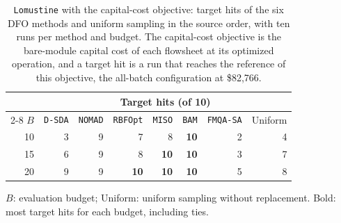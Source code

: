 \begin{table}[htbp]
\centering
\caption{\texttt{Lomustine} with the capital-cost objective: target hits of the six DFO methods and uniform sampling in the source order, with ten runs per method and budget.
The capital-cost objective is the bare-module capital cost of each flowsheet at its optimized operation, and a target hit is a run that reaches the reference of this objective, the all-batch configuration at \$82{,}766.}
\label{tab:supp-lomustine-capex}
\footnotesize
\setlength{\tabcolsep}{3.5pt}
\begin{threeparttable}
\begin{tabular}{@{}rrrrrrrr@{}}\toprule
 & \multicolumn{7}{c}{Target hits (of 10)}\\\cmidrule(l){2-8}
\(B\) & \texttt{D-SDA} & \texttt{NOMAD} & \texttt{RBFOpt} & \texttt{MISO} & \texttt{BAM} & \texttt{FMQA-SA} & Uniform\\\midrule
10 & 3 & 9 & 7 & 8 & \textbf{10} & 2 & 4 \\
15 & 6 & 9 & 8 & \textbf{10} & \textbf{10} & 3 & 7 \\
20 & 9 & 9 & \textbf{10} & \textbf{10} & \textbf{10} & 5 & 8 \\
\bottomrule
\end{tabular}
\begin{tablenotes}[flushleft]\footnotesize
\item \(B\): evaluation budget; Uniform: uniform sampling without replacement.
Bold: most target hits for each budget, including ties.
\end{tablenotes}
\end{threeparttable}
\end{table}

